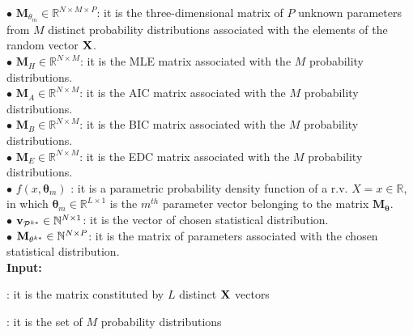 \begin{algorithm}[h!]
	\small
	\hspace{0.1cm}$\bullet$ $\mathbf{M}_{\theta_m} \in \mathbb{R}^{N \times M \times P}$: it is the three-dimensional matrix of $P$ unknown parameters from $M$ distinct probability distributions associated with the elements of the random vector $\bf X$.\\
	\hspace{0.1cm}$\bullet$ $\mathbf{M}_{H}\in \mathbb{R}^{N \times M}$: it is the MLE matrix associated with the $M$ probability distributions.\\
	\hspace{0.1cm}$\bullet$ $\mathbf{M}_{A}\in \mathbb{R}^{N \times M}$: it is the AIC matrix associated with the $M$ probability distributions.\\
	\hspace{0.1cm}$\bullet$ $\mathbf{M}_{B}\in \mathbb{R}^{N \times M}$: it is the BIC matrix associated with the $M$ probability distributions.\\
	\hspace{0.1cm}$\bullet$ $\mathbf{M}_{E}\in \mathbb{R}^{N \times M}$: it is the EDC matrix associated with the $M$ probability distributions.\\
	\hspace{0.1cm}$\bullet$ $f(x, \mathbf{\theta}_m)$ : it is a parametric probability density function of a \ac{r.v.} $X=x \in \mathbb{R}$, in which $\mathbf{\theta}_m \in \mathbb{R}^{L \times 1}$ is the $m^{th}$ parameter vector belonging to the matrix $\mathbf{M_{\theta}}$.\\
	\hspace{0.1cm}$\bullet$ ${\bf v}_{\mathcal{P}^{k*}} \in \mathbb{N}^{N \times 1}$: it is the vector of chosen statistical distribution.\\
	\hspace{0.1cm}$\bullet$ ${\bf M}_{\theta^{k*}} \in \mathbb{N}^{N \times P}$: it is the matrix of parameters associated with the chosen statistical distribution.\\
	\textbf{Input:}\\
	\begin{description}[font=\normalfont, align=left, labelindent=0.2cm] 
		\item[$\mathbf{M}_{\bf X} \in \mathbb{R}^{N\times L}$, in which ${\bf X}\in \{ {\bf |H|},{\bf \Theta} \}$]: it is the matrix constituted by $L$ distinct $\bf X$ vectors
		\item[$\mathcal{P}=\{\mathcal{P}_1,\ldots,\mathcal{P}_M\}$]: it is the set of $M$ probability distributions 
	\end{description}
	

\end{algorithm}
